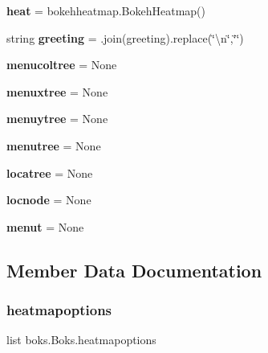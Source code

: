 \begin{DoxyCompactItemize}
{\bfseries heat} = bokehheatmap.\+Bokeh\+Heatmap()
\item 
\mbox{\label{classboks_1_1Boks_aff7cb2840868dcfaa7c5fc9d2814c589}} 
string {\bfseries greeting} = \textquotesingle{}\textquotesingle{}.join(greeting).replace(\char`\"{}\textbackslash{}n\char`\"{},\char`\"{}\char`\"{})
\item 
\mbox{\label{classboks_1_1Boks_ac5b642959d0fe2120d77aeae0538644a}} 
{\bfseries menucoltree} = None
\item 
\mbox{\label{classboks_1_1Boks_af0dc984bfe1a240ec7d6c7ce2abbc7e0}} 
{\bfseries menuxtree} = None
\item 
\mbox{\label{classboks_1_1Boks_ab226159bee0808ce3986777faa5e17b0}} 
{\bfseries menuytree} = None
\item 
\mbox{\label{classboks_1_1Boks_a0cede3338db7b18feaec68f6082dfd3f}} 
{\bfseries menutree} = None
\item 
\mbox{\label{classboks_1_1Boks_a16f30d82fc92074ef981e164f6a17f3d}} 
{\bfseries locatree} = None
\item 
\mbox{\label{classboks_1_1Boks_a839627abd2d50932c0ef9e9c58c062fd}} 
{\bfseries locnode} = None
\item 
\mbox{\label{classboks_1_1Boks_a23fa2a1aa0713a1467a1b031359b8513}} 
{\bfseries menut} = None
\end{DoxyCompactItemize}


\subsection{Member Data Documentation}
\mbox{\label{classboks_1_1Boks_adaa67dad916652354533a02b778e8495}} 
\subsubsection{\texorpdfstring{heatmapoptions}{heatmapoptions}}
{\footnotesize\ttfamily list boks.\+Boks.\+heatmapoptions\hspace{0.3cm}{\ttfamily [static]}}

